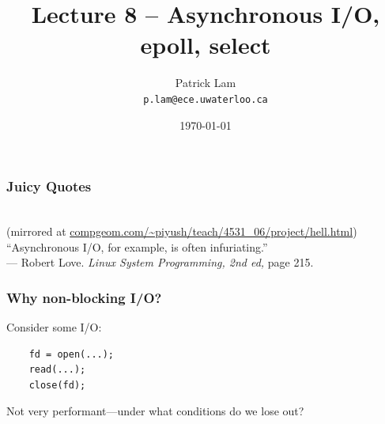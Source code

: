 

\title{Lecture 8 -- Asynchronous I/O, epoll, select }

\author{Patrick Lam \\ \small \texttt{p.lam@ece.uwaterloo.ca}}
\date{\today}




\begin{frame}
  \titlepage

 \end{frame}

\begin{frame}
  \frametitle{Juicy Quotes}


  \\
{\scriptsize (mirrored at \url{compgeom.com/~piyush/teach/4531_06/project/hell.html})}
   \\[3em]

   ``Asynchronous I/O, for example, is often infuriating.''\\
--- Robert Love. {\em Linux System Programming, 2nd ed, } page 215.
  

\end{frame}

\begin{frame}[fragile]
  \frametitle{Why non-blocking I/O?}
  
  Consider some I/O:


\begin{minipage}{.5\textwidth}
\begin{lstlisting}
    fd = open(...);
    read(...);
    close(fd);
  \end{lstlisting}
\end{minipage}


  Not very performant---under what conditions do we lose out?

\end{frame}

